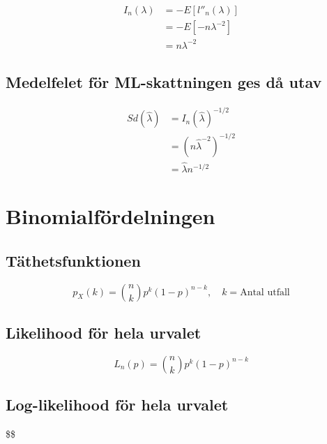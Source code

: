 \documentclass[
]{article}
\begin{document}
\[
\begin{aligned}
I_n(\lambda) &= - E[l''_n(\lambda)] \\
             &= - E[-n\lambda^{-2}] \\
             &= n\lambda^{-2}
\end{aligned}
\]

\hypertarget{medelfelet-fuxf6r-ml-skattningen-ges-duxe5-utav}{%
\subsection{Medelfelet för ML-skattningen ges då
utav}\label{medelfelet-fuxf6r-ml-skattningen-ges-duxe5-utav}}

\[
\begin{aligned}
Sd(\hat\lambda) &= I_n(\hat\lambda)^{-1/2} \\
                &= (n\hat\lambda^{-2})^{-1/2} \\
                &= \hat\lambda n^{-1/2}
\end{aligned}
\]

\hypertarget{binomialfuxf6rdelningen}{%
\section{Binomialfördelningen}\label{binomialfuxf6rdelningen}}

\hypertarget{tuxe4thetsfunktionen-1}{%
\subsection{Täthetsfunktionen}\label{tuxe4thetsfunktionen-1}}

\[
p_X(k) = {n \choose k} p^k(1 - p)^{n - k}, \quad k=\text{Antal utfall}
\]

\hypertarget{likelihood-fuxf6r-hela-urvalet}{%
\subsection{Likelihood för hela
urvalet}\label{likelihood-fuxf6r-hela-urvalet}}

\[
L_n(p) = {n \choose k} p^k(1 - p)^{n - k}
\]

\hypertarget{log-likelihood-fuxf6r-hela-urvalet-1}{%
\subsection{Log-likelihood för hela
urvalet}\label{log-likelihood-fuxf6r-hela-urvalet-1}}

\$\$
\end{document}
